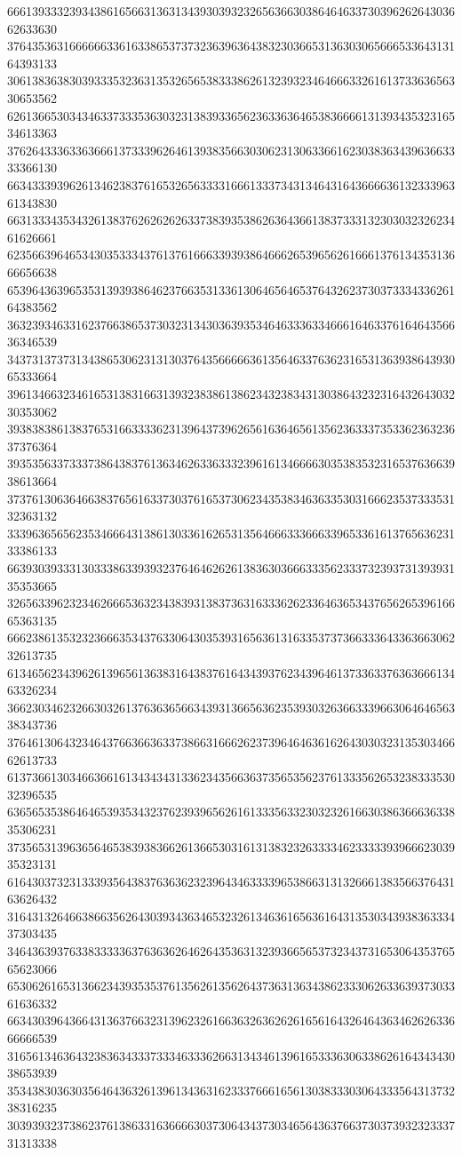 66613933323934386165663136313439303932326563663038646463373039626264303662633630
37643536316666663361633865373732363963643832303665313630306566653364313164393133
30613836383039333532363135326565383338626132393234646663326161373363656330653562
62613665303434633733353630323138393365623633636465383666613139343532316534613363
37626433363363666137333962646139383566303062313063366162303836343963663333366130
66343339396261346238376165326563333166613337343134643164366663613233396361343830
66313334353432613837626262626337383935386263643661383733313230303232623461626661
62356639646534303533343761376166633939386466626539656261666137613435313666656638
65396436396535313939386462376635313361306465646537643262373037333433626164383562
36323934633162376638653730323134303639353464633363346661646337616464356636346539
34373137373134386530623131303764356666636135646337636231653136393864393065333664
39613466323461653138316631393238386138623432383431303864323231643264303230353062
39383838613837653166333362313964373962656163646561356236333735336236323637376364
39353563373337386438376136346263363332396161346666303538353231653763663938613664
37376130636466383765616337303761653730623435383463633530316662353733353132363132
33396365656235346664313861303361626531356466633366633965336161376563623133386133
66393039333130333863393932376464626261383630366633356233373239373139393135353665
32656339623234626665363234383931383736316333626233646365343765626539616665363135
66623861353232366635343763306430353931656361316335373736633364336366306232613735
61346562343962613965613638316438376164343937623439646137336337636366613463326234
36623034623266303261376363656634393136656362353930326366333966306464656338343736
37646130643234643766366363373866316662623739646463616264303032313530346662613733
61373661303466366161343434313362343566363735653562376133356265323833353032396535
63656535386464653935343237623939656261613335633230323261663038636663633835306231
37356531396365646538393836626136653031613138323263333462333339396662303935323131
61643037323133393564383763636232396434633339653866313132666138356637643163626432
31643132646638663562643039343634653232613463616563616431353034393836333437303435
34643639376338333336376363626462643536313239366565373234373165306435376565623066
65306261653136623439353537613562613562643736313634386233306263363937303361636332
66343039643664313637663231396232616636326362626165616432646436346262633666666539
31656134636432383634333733346333626631343461396165333630633862616434343038653939
35343830363035646436326139613436316233376661656130383330306433356431373238316235
30393932373862376138633163666630373064343730346564363766373037393232333731313338
